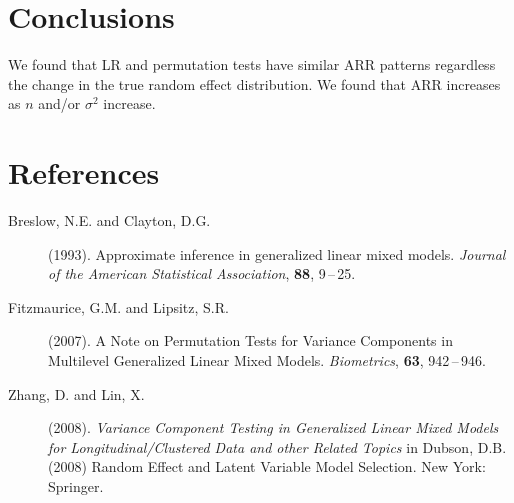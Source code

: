 \documentclass{sciposter}
\begin{document}
\begin{boldmath}
\begin{multicols}{3}
\section{Conclusions}
We found that LR and permutation tests have similar ARR patterns regardless the change in the true random effect distribution. We found that ARR increases as $n$ and/or $\sigma^2$ increase.

\section*{References}
\begin{description}
\item[Breslow, N.E. and Clayton, D.G.] (1993).
     Approximate inference in ge\-ne\-ra\-li\-zed linear mixed models.
     {\it Journal of the American Statistical Association}, {\bf 88},
     9\,--\,25.
     
\item[Fitzmaurice, G.M. and Lipsitz, S.R.] (2007).
     A Note on Permutation Tests for Variance Components in Multilevel Generalized Linear Mixed Models.
     {\it Biometrics}, {\bf 63},
      942\,--\,946.
     
\item[Zhang, D. and Lin, X.] (2008).
     {\it Variance Component Testing in Generalized Linear Mixed Models for Longitudinal/Clustered Data and other Related Topics} in Dubson, D.B. (2008) Random Effect and Latent Variable Model Selection.
     New York: Springer.
\end{description}


\end{multicols}
\end{boldmath}
\end{document}
